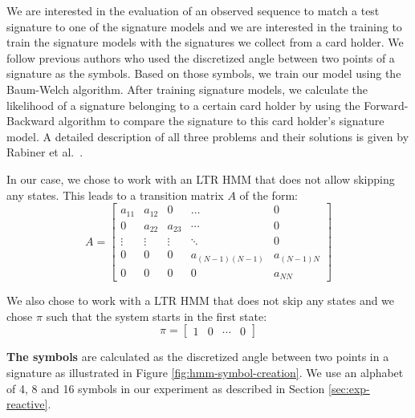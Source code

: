 \documentclass[a4paper, oneside]{csthesis}
\begin{document}
We are interested in the evaluation of an observed sequence to match a test signature to one of the signature models and we are interested in the training to train the signature models with the signatures we collect from a card holder. We follow previous authors who used the discretized angle between two points of a signature as the symbols. Based on those symbols, we train our model using the Baum-Welch algorithm. After training signature models, we calculate the likelihood of a signature belonging to a certain card holder by using the Forward-Backward algorithm to compare the signature to this card holder's signature model. A detailed description of all three problems and their solutions is given by Rabiner et al.~\cite{rabiner1989tutorial}.

In our case, we chose to work with an LTR HMM that does not allow skipping any states. This leads to a transition matrix $A$ of the form:
\begin{equation}
A = \left[\begin{array}{ccccc}a_{11} & a_{12} & 0 & \hdots & 0 \\0 & a_{22} & a_{23} & \cdots & 0 \\\vdots & \vdots & \vdots & \ddots & 0 \\0 & 0 & 0 & a_{(N-1)(N-1)} & a_{(N-1)N} \\0 & 0 & 0 & 0 & a_{NN}\end{array}\right]
\label{eq:hmm-transition-matrix}
\end{equation}


We also chose to work with a LTR HMM that does not skip any states and we chose $\pi$ such that the system starts in the first state:
$$\pi = \left[\begin{array}{cccc}1 & 0 & \cdots & 0\end{array}\right]$$


\textbf{The symbols} are calculated as the discretized angle between two points in a signature as illustrated in Figure \ref{fig:hmm-symbol-creation}. We use an alphabet of 4, 8 and 16 symbols in our experiment as described in Section \ref{sec:exp-reactive}.
\end{document}
